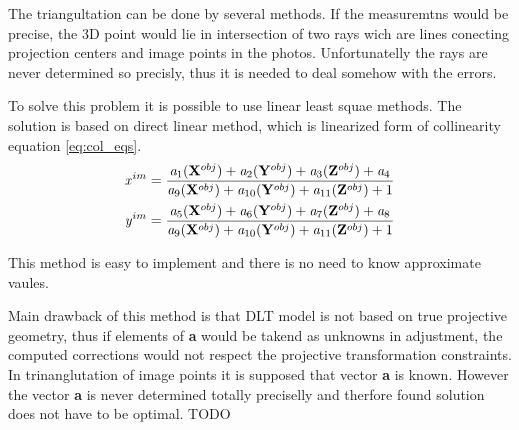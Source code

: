 \documentclass[a4paper,12pt]{report}
\newcommand{\evect}[1]{
{\bf #1}
}
\newcommand{\escal}[1]{
{\it #1}
}
\begin{document}
The triangultation can be done by several methods. If the measuremtns would be precise, the 3D point 
would lie in intersection of two rays wich are lines conecting projection centers and image points 
in the photos. Unfortunatelly the rays are never determined so precisly, thus it is needed to deal 
somehow with the errors. 

To solve this problem it is possible to use linear least squae methods. The solution is based 
on direct linear method, which is linearized form of collinearity equation \eqref{eq:col_eqs}.
\begin{equation}
\label{eq:col_eqs}
\begin{split}
&\escal{x}^{im} = \frac{\escal{a}_{1}(\evect{X}^{obj}) + 
                                  \escal{a}_{2}(\evect{Y}^{obj}) + 
                                  \escal{a}_{3}(\evect{Z}^{obj}) +
                                  \escal{a}_{4}
                                  }{
				  \escal{a}_{9}(\evect{X}^{obj}) + 
                                  \escal{a}_{10}(\evect{Y}^{obj}) + 
                                  \escal{a}_{11}(\evect{Z}^{obj}) +
                                   1  
                                  } \\
&\escal{y}^{im} = \frac{\escal{a}_{5}(\evect{X}^{obj}) + 
                                  \escal{a}_{6}(\evect{Y}^{obj}) + 
                                  \escal{a}_{7}(\evect{Z}^{obj}) +                                 
                                  \escal{a}_{8}
                                  }{
				  \escal{a}_{9}(\evect{X}^{obj}) + 
                                  \escal{a}_{10}(\evect{Y}^{obj}) + 
                                  \escal{a}_{11}(\evect{Z}^{obj}) +    
                                  1
                                  }
\end{split}
\end{equation}

This method is easy to implement and there is no need to know approximate vaules.


Main drawback of this method is that DLT model is not based on true projective geometry, thus 
if elements of \evect{a} would be takend as unknowns in adjustment, the computed corrections 
would not respect the projective transformation constraints.  In trinanglutation of image points 
it is supposed that vector \evect{a} is known. However the vector \evect{a} is never determined 
totally preciselly and therfore found solution does not have to be optimal.
TODO
\end{document}
